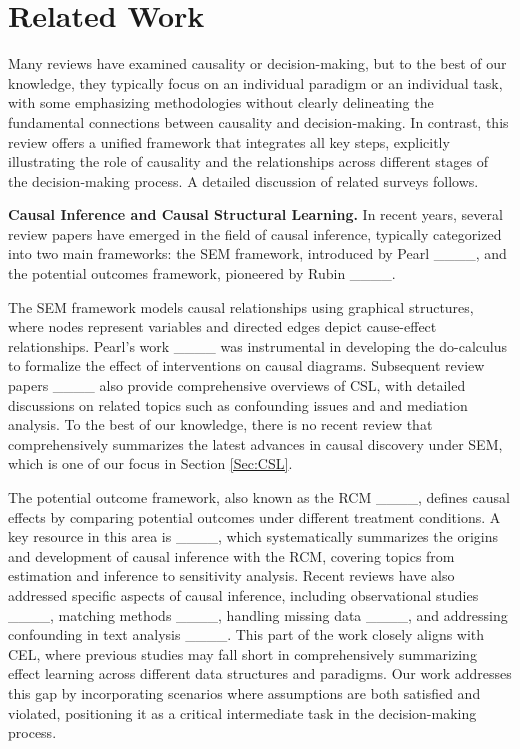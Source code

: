\section{Related Work}
\label{sec::related_work}
Many reviews have examined causality or decision-making, but to the best of our knowledge, they typically focus on an individual paradigm or an individual task, with some emphasizing methodologies without clearly delineating the fundamental connections between causality and decision-making. In contrast, this review offers a unified framework that integrates all key steps, explicitly illustrating the role of causality and the relationships across different stages of the decision-making process. A detailed discussion of related surveys follows.

\noindent \textbf{Causal Inference and Causal Structural Learning.} In recent years, several review papers have emerged in the field of causal inference, typically categorized into two main frameworks: the \acrfull{SEM} framework, introduced by Pearl ____, and the potential outcomes framework, pioneered by Rubin ____.

The \acrshort{SEM} framework models causal relationships using graphical structures, where nodes represent variables and directed edges depict cause-effect relationships. Pearl’s work ____ was instrumental in developing the do-calculus to formalize the effect of interventions on causal diagrams. Subsequent review papers ____ also provide comprehensive overviews of \acrshort{CSL}, with detailed discussions on related topics such as confounding issues and and mediation analysis. To the best of our knowledge, there is no recent review that comprehensively summarizes the latest advances in causal discovery under \acrshort{SEM}, which is one of our focus in Section \ref{Sec:CSL}.

The potential outcome framework, also known as the \acrfull{RCM} ____, defines causal effects by comparing potential outcomes under different treatment conditions. A key resource in this area is ____, which systematically summarizes the origins and development of causal inference with the \acrshort{RCM}, covering topics from estimation and inference to sensitivity analysis. Recent reviews have also addressed specific aspects of causal inference, including observational studies ____, matching methods ____, handling missing data ____, and addressing confounding in text analysis ____. This part of the work closely aligns with \acrshort{CEL}, where previous studies may fall short in comprehensively summarizing effect learning across different data structures and paradigms. Our work addresses this gap by incorporating scenarios where assumptions are both satisfied and violated, positioning it as a critical intermediate task in the decision-making process.

